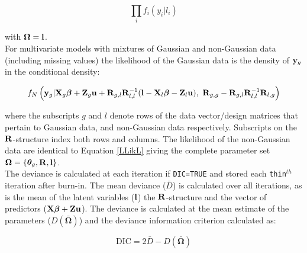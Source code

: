 \documentclass{article}
\begin{document}
\begin{equation}
\prod_{i}f_{i}(y_{i} | l_{i})
\label{LLikL}
\end{equation}

with ${\bm \Omega} = {\bf l}$.\\

For multivariate models with mixtures of Gaussian and non-Gaussian data (including missing values) the likelihood of the Gaussian data is the density of ${\bf y}_{g}$ in the conditional density:

\begin{equation}
f_{N}\left({\bf y}_{g} | {\bf X}_{g}{\bm \beta}+{\bf Z}_{g}{\bf u}+{\bf R}_{g,l}{\bf R}^{-1}_{l,l}({\bf l}-{\bf X}_{l}{\bm \beta}-{\bf Z}_{l}{\bf u}),\ {\bf R}_{g,g}-{\bf R}_{g,l}{\bf R}^{-1}_{l,l}{\bf R}_{l,g}\right) 
\end{equation}

where the subscripts $g$ and $l$ denote rows of the data vector/design matrices that pertain to Gaussian data, and non-Gaussian data respectively. Subscripts on the ${\bf R}$-structure index both rows and columns. The likelihood of the non-Gaussian data are identical to Equation \ref{LLikL} giving the complete parameter set ${\bm \Omega} = \left\{{\bm \theta}_{g}, {\bf R}, {\bf l} \right\}$.\\

The deviance is calculated at each iteration if \texttt{DIC=TRUE} and stored each \texttt{thin}$^{th}$ iteration after burn-in.  The mean deviance ($\bar{D}$) is calculated over all iterations, as is the mean of the latent variables (${\bf l}$) the ${\bf R}$-structure and the vector of predictors (${\bf X}{\bm \beta}+{\bf Z}{\bf u}$).  The deviance is calculated at the mean estimate of the parameters ($D(\bar{\bm \Omega})$) and the deviance information criterion calculated as:

\begin{equation}
\textrm{DIC} = 2\bar{D}-D(\bar{\bm \Omega})
\end{equation}

\ifalone
\end{document}
